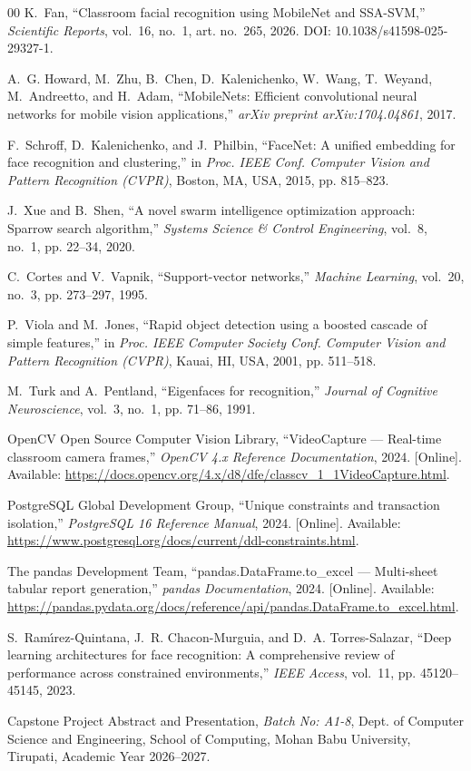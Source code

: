 \documentclass[conference]{IEEEtran}
\begin{document}
\begin{thebibliography}{00}
K.~Fan, ``Classroom facial recognition using MobileNet and SSA-SVM,'' \emph{Scientific Reports}, vol.~16, no.~1, art. no.~265, 2026. DOI: 10.1038/s41598-025-29327-1.

A.~G. Howard, M.~Zhu, B.~Chen, D.~Kalenichenko, W.~Wang, T.~Weyand, M.~Andreetto, and H.~Adam, ``MobileNets: Efficient convolutional neural networks for mobile vision applications,'' \emph{arXiv preprint arXiv:1704.04861}, 2017.

F.~Schroff, D.~Kalenichenko, and J.~Philbin, ``FaceNet: A unified embedding for face recognition and clustering,'' in \emph{Proc. IEEE Conf. Computer Vision and Pattern Recognition (CVPR)}, Boston, MA, USA, 2015, pp. 815--823.

J.~Xue and B.~Shen, ``A novel swarm intelligence optimization approach: Sparrow search algorithm,'' \emph{Systems Science \& Control Engineering}, vol.~8, no.~1, pp. 22--34, 2020.

C.~Cortes and V.~Vapnik, ``Support-vector networks,'' \emph{Machine Learning}, vol.~20, no.~3, pp. 273--297, 1995.

P.~Viola and M.~Jones, ``Rapid object detection using a boosted cascade of simple features,'' in \emph{Proc. IEEE Computer Society Conf. Computer Vision and Pattern Recognition (CVPR)}, Kauai, HI, USA, 2001, pp. 511--518.

M.~Turk and A.~Pentland, ``Eigenfaces for recognition,'' \emph{Journal of Cognitive Neuroscience}, vol.~3, no.~1, pp. 71--86, 1991.

OpenCV Open Source Computer Vision Library, ``VideoCapture --- Real-time classroom camera frames,'' \emph{OpenCV 4.x Reference Documentation}, 2024. [Online]. Available: \url{https://docs.opencv.org/4.x/d8/dfe/classcv_1_1VideoCapture.html}.

PostgreSQL Global Development Group, ``Unique constraints and transaction isolation,'' \emph{PostgreSQL 16 Reference Manual}, 2024. [Online]. Available: \url{https://www.postgresql.org/docs/current/ddl-constraints.html}.

The pandas Development Team, ``pandas.DataFrame.to\_excel --- Multi-sheet tabular report generation,'' \emph{pandas Documentation}, 2024. [Online]. Available: \url{https://pandas.pydata.org/docs/reference/api/pandas.DataFrame.to_excel.html}.

S.~Ram{\'\i}rez-Quintana, J.~R. Chacon-Murguia, and D.~A. Torres-Salazar, ``Deep learning architectures for face recognition: A comprehensive review of performance across constrained environments,'' \emph{IEEE Access}, vol.~11, pp. 45120--45145, 2023.

Capstone Project Abstract and Presentation, \emph{Batch No: A1-8}, Dept. of Computer Science and Engineering, School of Computing, Mohan Babu University, Tirupati, Academic Year 2026--2027.
\end{thebibliography}
\end{document}

